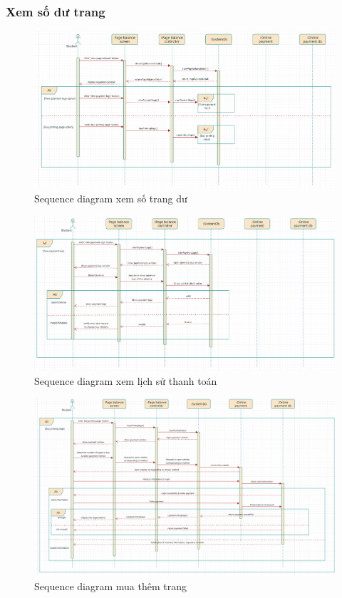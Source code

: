 \documentclass[a4paper]{article}
\begin{document}
\subsubsection{Xem số dư trang}
\begin{figure}[h!]
\begin{center}
\includegraphics[width=15cm]{picture/Sequence_diagram_viewpagebalance.png}
\caption{Sequence diagram xem số trang dư}
\end{center}
\end{figure}
\begin{figure}[h!]
\begin{center}
\includegraphics[width=16cm]{picture/Sequence_diagram_viewprintinglogs.png}
\caption{Sequence diagram xem lịch sử thanh toán}
\end{center}
\end{figure}
\newpage
\begin{figure}[h!]
\begin{center}
\includegraphics[width=16cm]{picture/Sequence_diagram_buyprintingpages.png}
\caption{Sequence diagram mua thêm trang}
\end{center}
\end{figure}
\end{document}
